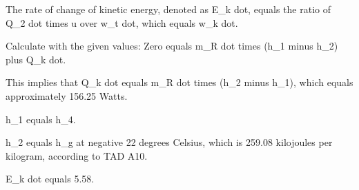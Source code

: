 The rate of change of kinetic energy, denoted as E_k dot, equals the ratio of Q_2 dot times u over w_t dot, which equals w_k dot.

Calculate with the given values:
Zero equals m_R dot times (h_1 minus h_2) plus Q_k dot.

This implies that Q_k dot equals m_R dot times (h_2 minus h_1), which equals approximately 156.25 Watts.

h_1 equals h_4.

h_2 equals h_g at negative 22 degrees Celsius, which is 259.08 kilojoules per kilogram, according to TAD A10.

E_k dot equals 5.58.
